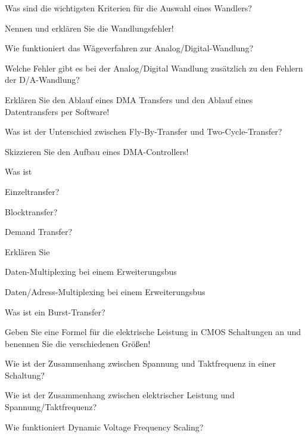\documentclass
[
  draft    = true,
  fontsize = 11pt,
  parskip  = half-,
  BCOR     = 0pt,
  DIV      = 11,
  ngerman,
  dvipsnames
]
{scrartcl}
\begin{document}
\begin{mytemize}
  \item Was sind die wichtigsten Kriterien für die Auswahl eines Wandlers?
  \item Nennen und erklären Sie die Wandlungsfehler!
  \item Wie funktioniert das Wägeverfahren zur Analog/Digital-Wandlung?
  \item Welche Fehler gibt es bei der Analog/Digital Wandlung zusätzlich zu den Fehlern der D/A-Wandlung?
  \item Erklären Sie den Ablauf eines DMA Transfers und den Ablauf eines Datentransfers per Software!
  \item Was ist der Unterschied zwischen Fly-By-Transfer und Two-Cycle-Transfer?
  \item Skizzieren Sie den Aufbau eines DMA-Controllers!
  \item Was ist
        \begin{mytemize}
          \item Einzeltransfer?
          \item Blocktransfer?
          \item Demand Transfer?
        \end{mytemize}
  \item Erklären Sie
        \begin{mytemize}
          \item Daten-Multiplexing bei einem Erweiterungsbus
          \item Daten/Adress-Multiplexing bei einem Erweiterungsbus
        \end{mytemize}
  \item Was ist ein Burst-Transfer?
  \item Geben Sie eine Formel für die elektrische Leistung in CMOS Schaltungen an und benennen Sie die verschiedenen Größen!
  \item Wie ist der Zusammenhang zwischen Spannung und Taktfrequenz in einer Schaltung?
  \item Wie ist der Zusammenhang zwischen elektrischer Leistung und Spannung/Taktfrequenz?
  \item Wie funktioniert Dynamic Voltage Frequency Scaling?
\end{mytemize}

\end{document}
